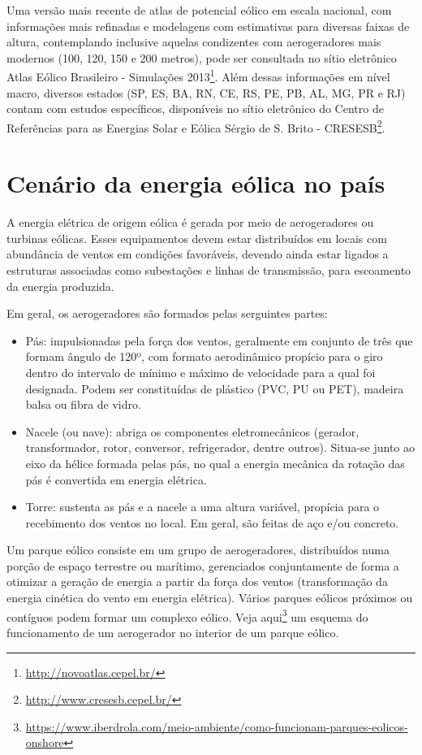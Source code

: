 \documentclass[
  oneside]{scrbook}
\DeclareRobustCommand{\href}[2]{#2\footnote{\url{#1}}}
\begin{document}
Uma versão mais recente de atlas de potencial eólico em escala nacional, com informações mais refinadas e modelagens com estimativas para diversas faixas de altura, contemplando inclusive aquelas condizentes com aerogeradores mais modernos (100, 120, 150 e 200 metros), pode ser consultada no sítio eletrônico \href{http://novoatlas.cepel.br/}{Atlas Eólico Brasileiro - Simulações 2013}. Além dessas informações em nível macro, diversos estados (SP, ES, BA, RN, CE, RS, PE, PB, AL, MG, PR e RJ) contam com estudos específicos, disponíveis no sítio eletrônico do \href{http://www.cresesb.cepel.br/}{Centro de Referências para as Energias Solar e Eólica Sérgio de S. Brito - CRESESB}.

\hypertarget{cenuxe1rio-da-energia-euxf3lica-no-pauxeds}{%
\section{Cenário da energia eólica no país}\label{cenuxe1rio-da-energia-euxf3lica-no-pauxeds}}

A energia elétrica de origem eólica é gerada por meio de aerogeradores ou turbinas eólicas. Esses equipamentos devem estar distribuídos em locais com abundância de ventos em condições favoráveis, devendo ainda estar ligados a estruturas associadas como subestações e linhas de transmissão, para escoamento da energia produzida.

Em geral, os aerogeradores são formados pelas serguintes partes:

\begin{itemize}
\item
  Pás: impulsionadas pela força dos ventos, geralmente em conjunto de três que formam ângulo de 120º, com formato aerodinâmico propício para o giro dentro do intervalo de mínimo e máximo de velocidade para a qual foi designada. Podem ser constituídas de plástico (PVC, PU ou PET), madeira balsa ou fibra de vidro.
\item
  Nacele (ou nave): abriga os componentes eletromecânicos (gerador, transformador, rotor, conversor, refrigerador, dentre outros). Situa-se junto ao eixo da hélice formada pelas pás, no qual a energia mecânica da rotação das pás é convertida em energia elétrica.
\item
  Torre: sustenta as pás e a nacele a uma altura variável, propícia para o recebimento dos ventos no local. Em geral, são feitas de aço e/ou concreto.
\end{itemize}

Um parque eólico consiste em um grupo de aerogeradores, distribuídos numa porção de espaço terrestre ou marítimo, gerenciados conjuntamente de forma a otimizar a geração de energia a partir da força dos ventos (transformação da energia cinética do vento em energia elétrica). Vários parques eólicos próximos ou contíguos podem formar um complexo eólico. \href{https://www.iberdrola.com/meio-ambiente/como-funcionam-parques-eolicos-onshore}{Veja aqui} um esquema do funcionamento de um aerogerador no interior de um parque eólico.
\end{document}
